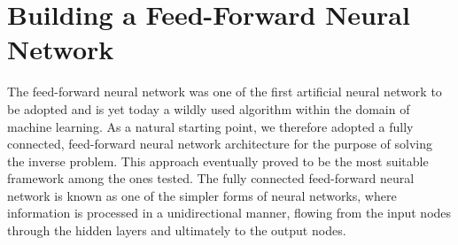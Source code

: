 \documentclass[a4paper, UKenglish, 11pt]{uiomaster}
\begin{document}
%
%
%


\section{Building a Feed-Forward Neural Network}
The feed-forward neural network was one of the first artificial neural network to be adopted and is yet today a wildly used algorithm within the domain of machine learning. As a natural starting point, we therefore adopted a fully connected, feed-forward neural network architecture for the purpose of solving the inverse problem. This approach eventually proved to be the most suitable framework among the ones tested. The fully connected feed-forward neural network is known as one of the simpler forms of neural networks, where information is processed in a unidirectional manner, flowing from the input nodes through the hidden layers and ultimately to the output nodes.
\end{document}

